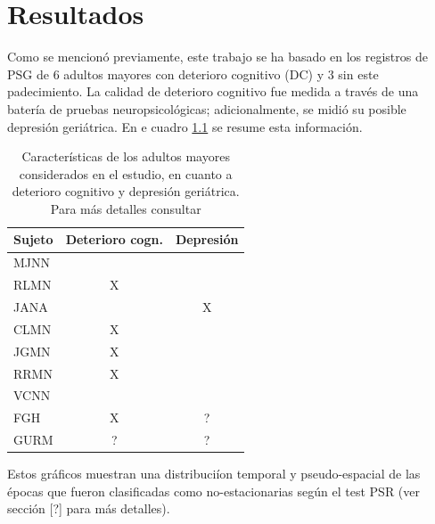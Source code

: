 \chapter{Resultados}

Como se mencion\'o previamente, este trabajo se ha basado en los registros de PSG de 6 adultos
mayores con deterioro cognitivo (DC) y 3 sin este padecimiento. La calidad de deterioro
cognitivo fue medida a trav\'es de una bater\'ia de pruebas neuropsicol\'ogicas;
adicionalmente, se midi\'o su posible depresi\'on geri\'atrica. 
En e cuadro \ref{sujetos} se resume esta informaci\'on.

\begin{table}
\centering
\begin{tabular}{l|cc}
Sujeto & Deterioro cogn. & Depresi\'on
\\
\hline
MJNN &   &   \\
RLMN & X &   \\
JANA &   & X \\
CLMN & X &   \\
JGMN & X &   \\
RRMN & X &   \\
VCNN &   &   \\
FGH  & X & ? \\
GURM & ? & ? \\
\end{tabular}
\caption{Caracter\'isticas de los adultos mayores considerados en el estudio, en cuanto
a deterioro cognitivo y depresi\'on geri\'atrica. 
Para m\'as detalles consultar \cite{VazquezTagle16}}
\label{sujetos}
\end{table}

Estos gr\'aficos muestran una distribuci\'ion temporal y pseudo-espacial 
de las \'epocas que fueron clasificadas como {no-estacionarias} seg\'un el test PSR
(ver secci\'on [?] para m\'as detalles). 

